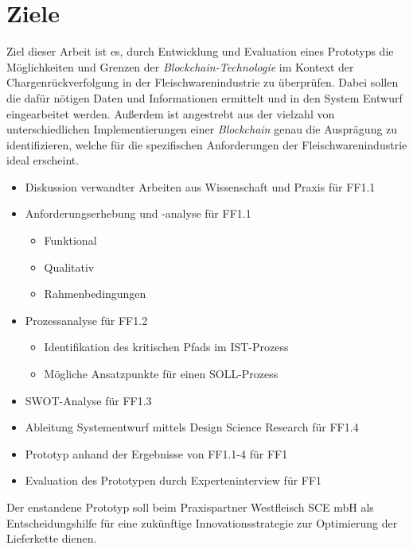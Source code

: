 \section{Ziele}

Ziel dieser Arbeit ist es, durch Entwicklung und Evaluation eines Prototyps die Möglichkeiten und Grenzen der \textit{Blockchain-Technologie} im Kontext der Chargenrückverfolgung in der Fleischwarenindustrie zu überprüfen. Dabei sollen die dafür nötigen Daten und Informationen ermittelt und in den System Entwurf eingearbeitet werden. Außerdem ist angestrebt aus der vielzahl von unterschiedlichen Implementierungen einer \textit{Blockchain} genau die Ausprägung zu identifizieren, welche für die spezifischen Anforderungen der Fleischwarenindustrie ideal erscheint.

\begin{itemize}
  \item Diskussion verwandter Arbeiten aus Wissenschaft und Praxis für FF1.1
  \item Anforderungserhebung und -analyse für FF1.1
  \begin{itemize}
    \item Funktional
    \item Qualitativ
    \item Rahmenbedingungen
  \end{itemize}
  \item Prozessanalyse für FF1.2
  \begin{itemize}
    \item Identifikation des \glqq kritischen Pfads\grqq{} im IST-Prozess
    \item Mögliche Ansatzpunkte für einen SOLL-Prozess
  \end{itemize}
  \item SWOT-Analyse für FF1.3
  \item Ableitung Systementwurf mittels Design Science Research für FF1.4
  \item Prototyp anhand der Ergebnisse von FF1.1-4 für FF1
  \item Evaluation des Prototypen durch Experteninterview für FF1
\end{itemize}

Der enstandene Prototyp soll beim Praxispartner Westfleisch SCE mbH als Entscheidungshilfe für eine zukünftige Innovationsstrategie zur Optimierung der Lieferkette dienen.


